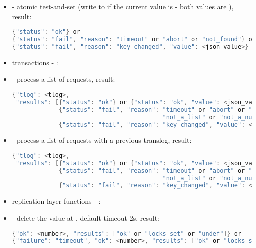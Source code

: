 \begin{itemize}
\begin{lstlisting}[language=java]
{"status": "ok"} or
{"status": "fail", "reason": "timeout" or "abort" or "not_a_number"}
\end{lstlisting}
  \item {} - atomic test-and-set
  (write  to  if the current value is 
   - both values are ), result:
\begin{lstlisting}[language=java]
{"status": "ok"} or
{"status": "fail", "reason": "timeout" or "abort" or "not_found"} or
{"status": "fail", "reason": "key_changed", "value": <json_value>}
\end{lstlisting}
  \item[] \hspace{-1.7em}transactions - :
  \item {} - process a list of requests, result:
\begin{lstlisting}[language=java]
{"tlog": <tlog>,
 "results": [{"status": "ok"} or {"status": "ok", "value": <json_value>} or
             {"status": "fail", "reason": "timeout" or "abort" or "not_found" or
                                          "not_a_list" or "not_a_number"} or
             {"status": "fail", "reason": "key_changed", "value": <json_value>}]}
\end{lstlisting}
  \item {} - process a list of requests with a previous translog, result:
\begin{lstlisting}[language=java]
{"tlog": <tlog>,
 "results": [{"status": "ok"} or {"status": "ok", "value": <json_value>} or
             {"status": "fail", "reason": "timeout" or "abort" or "not_found" or
                                          "not_a_list" or "not_a_number"} or
             {"status": "fail", "reason": "key_changed", "value": <json_value>}]}
\end{lstlisting}
  \item[] \hspace{-1.7em}replication layer functions - :
  \item {} - delete the value at , default timeout 2s, result:
\begin{lstlisting}[language=java]
{"ok": <number>, "results": ["ok" or "locks_set" or "undef"]} or
{"failure": "timeout", "ok": <number>, "results": ["ok" or "locks_set" or "undef"]}

\end{lstlisting}
\end{itemize}
